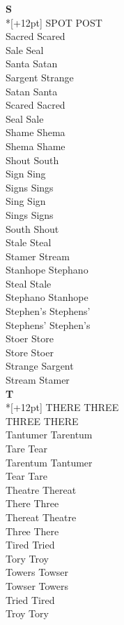 \vspace{14pt}
\noindent\textbf{\Large S}\\*[+12pt]
SPOT POST\\
Sacred Scared\\
Sale Seal\\
Santa Satan\\
Sargent Strange\\
Satan Santa\\
Scared Sacred\\
Seal Sale\\
Shame Shema\\
Shema Shame\\
Shout South\\
Sign Sing\\
Signs Sings\\
Sing Sign\\
Sings Signs\\
South Shout\\
Stale Steal\\
Stamer Stream\\
Stanhope Stephano\\
Steal Stale\\
Stephano Stanhope\\
Stephen's Stephens'\\
Stephens' Stephen's\\
Stoer Store\\
Store Stoer\\
Strange Sargent\\
Stream Stamer\\

\vspace{14pt}
\noindent\textbf{\Large T}\\*[+12pt]
THERE THREE\\
THREE THERE\\
Tantumer Tarentum\\
Tare Tear\\
Tarentum Tantumer\\
Tear Tare\\
Theatre Thereat\\
There Three\\
Thereat Theatre\\
Three There\\
Tired Tried\\
Tory Troy\\
Towers Towser\\
Towser Towers\\
Tried Tired\\
Troy Tory\\

